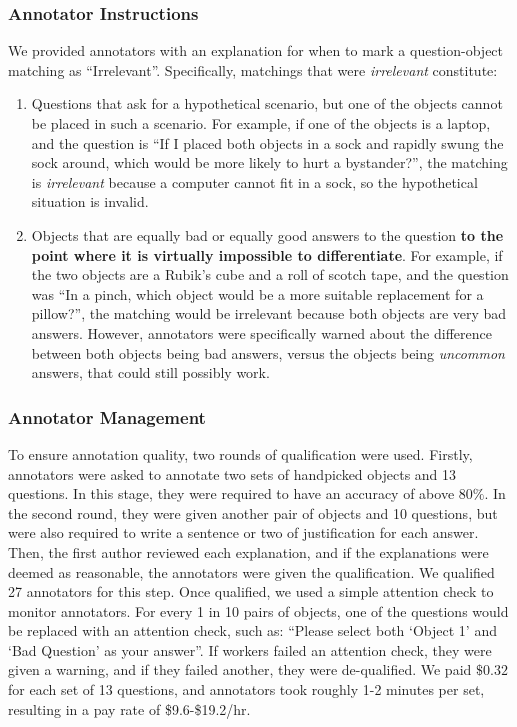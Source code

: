 \documentclass[runningheads]{llncs}
\begin{document}
\subsubsection{Annotator Instructions} We provided annotators with an explanation for when to mark a question-object matching as ``Irrelevant''. Specifically, matchings that were \textit{irrelevant} constitute:
\begin{enumerate}
    \item Questions that ask for a hypothetical scenario, but one of the objects cannot be placed in such a scenario. For example, if one of the objects is a laptop, and the question is ``If I placed both objects in a sock and rapidly swung the sock around, which would be more likely to hurt a bystander?'', the matching is \textit{irrelevant} because a computer cannot fit in a sock, so the hypothetical situation is invalid.
    \item Objects that are equally bad or equally good answers to the question \textbf{to the point where it is virtually impossible to differentiate}. For example, if the two objects are a Rubik's cube and a roll of scotch tape, and the question was ``In a pinch, which object would be a more suitable replacement for a pillow?'', the matching would be irrelevant because both objects are very bad answers. However, annotators were specifically warned about the difference between both objects being bad answers, versus the objects being \textit{uncommon} answers, that could still possibly work.
\end{enumerate}

\subsubsection{Annotator Management}

To ensure annotation quality, two rounds of qualification were used. Firstly, annotators were asked to annotate two sets of handpicked objects and 13 questions. In this stage, they were required to have an accuracy of above $80\%$. In the second round, they were given another pair of objects and 10 questions, but were also required to write a sentence or two of justification for each answer. Then, the first author reviewed each explanation, and if the explanations were deemed as reasonable, the annotators were given the qualification. We qualified 27 annotators for this step. Once qualified, we used a simple attention check to monitor annotators. For every 1 in 10 pairs of objects, one of the questions would be replaced with an attention check, such as: ``Please select both `Object 1' and `Bad Question' as your answer''. If workers failed an attention check, they were given a warning, and if they failed another, they were de-qualified. We paid $\$0.32$ for each set of 13 questions, and annotators took roughly 1-2 minutes per set, resulting in a pay rate of \$9.6-\$19.2/hr. 
\end{document}

